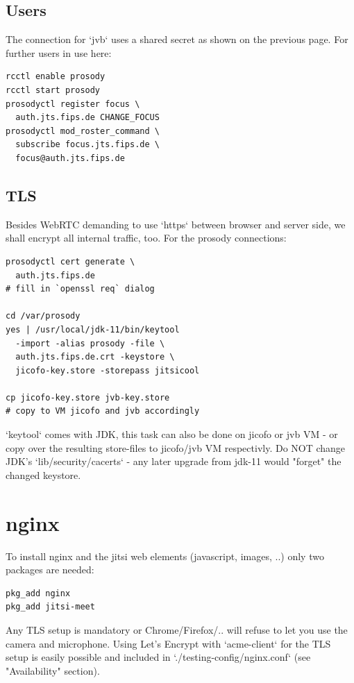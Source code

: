 \documentclass[conference]{IEEEtran}
\begin{document}
\subsection{Users}
The connection for `jvb` uses a shared secret as shown on the previous page.
For further users in use here:
\begin{verbatim}
rcctl enable prosody
rcctl start prosody
prosodyctl register focus \
  auth.jts.fips.de CHANGE_FOCUS
prosodyctl mod_roster_command \ 
  subscribe focus.jts.fips.de \
  focus@auth.jts.fips.de
\end{verbatim}
\subsection{TLS}
Besides WebRTC demanding to use `https` between browser and server side, we shall
encrypt all internal traffic, too. For the prosody connections:
\begin{verbatim}
prosodyctl cert generate \
  auth.jts.fips.de
# fill in `openssl req` dialog

cd /var/prosody
yes | /usr/local/jdk-11/bin/keytool
  -import -alias prosody -file \
  auth.jts.fips.de.crt -keystore \
  jicofo-key.store -storepass jitsicool
  
cp jicofo-key.store jvb-key.store 
# copy to VM jicofo and jvb accordingly
\end{verbatim}
`keytool` comes with JDK, this task can also be done on jicofo or jvb VM - or copy
over the resulting store-files to jicofo/jvb VM respectivly.
Do NOT change JDK's `lib/security/cacerts` - any later upgrade from jdk-11
would "forget" the changed keystore.

\section{nginx}
To install nginx and the jitsi web elements (javascript, images, ..) only two packages
are needed:
\begin{verbatim}
pkg_add nginx
pkg_add jitsi-meet
\end{verbatim}
Any TLS setup is mandatory or Chrome/Firefox/.. will refuse to let you
use the camera and microphone.
Using Let's Encrypt with `acme-client` for the TLS setup is easily possible and included
in `./testing-config/nginx.conf` (see "Availability" section).
\end{document}
